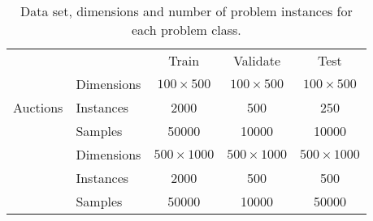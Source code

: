 \begin{scriptsize}
\begin{table}[ht]
	\centering
	\begin{tabular}{llccc}
		\toprule
		  && \multicolumn{1}{c}{Train} & \multicolumn{1}{c}{Validate} & \multicolumn{1}{c}{Test}\\
		  \cmidrule(lr){3-3} \cmidrule(lr){4-4} \cmidrule(lr){5-5}
		  \multirow{3}{*}{Auctions} & Dimensions & $100 \times 500$ & $100 \times 500$ & $100 \times 500$ \\
		& Instances & 2000 &  500  & 250\\
		& Samples & 50000 &  10000  & 10000 \\
		\addlinespace
		\multirow{3}{*}{Setcover} & Dimensions & $500\times1000$ & $500\times1000$ & $500\times1000$\\
		 & Instances & 2000 &  500  & 500 \\
		 & Samples & 50000 &  10000  & 50000 \\
		\bottomrule
	\end{tabular}
	\caption{Data set, dimensions and number of problem instances for each problem class.}\label{tab:instances}
\end{table}
\end{scriptsize}

\begin{comment}
  \begin{scriptsize}
\begin{table}[ht]
	\centering
	\begin{tabular}{llccc}
		\toprule
		&& \multicolumn{1}{c}{Small} & \multicolumn{1}{c}{Medium} & \multicolumn{1}{c}{Large}\\
		  \cmidrule(lr){3-3} \cmidrule(lr){4-4} \cmidrule(lr){5-5}
		  \multirow{2}{*}{Auctions} & Dimensions & $100 \times 500$ & $200 \times 1000$ & $300 \times 1500$ \\
		& Instances & 250 &  50  & 20\\
		\addlinespace
		\multirow{2}{*}{Setcover} & Dimensions & $500\times1000$ & $1000\times1000$ & $2000\times1000$\\
		 & Instances & 250 &  50  & 20 \\
		\bottomrule
	\end{tabular}
	\caption{Data set, dimensions and number of problem instances for each problem class.}\label{tab:samp_transf}
\end{table}
\end{scriptsize}
  
\end{comment}




